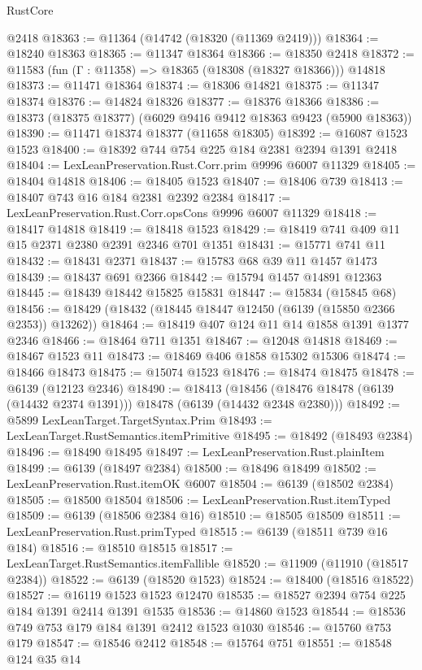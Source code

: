 \begin{lexlean}{RustCore}
\begin{coremodule}
    @2418
@18363 := @11364 (@14742 (@18320 (@11369 @2419)))
@18364 := @18240 @18363
@18365 := @11347 @18364
@18366 := @18350 @2418
@18372 := @11583 (fun (Γ : @11358) => @18365 (@18308 (@18327 @18366))) @14818
@18373 := @11471 @18364
@18374 := @18306 @14821
@18375 := @11347 @18374
@18376 := @14824 @18326
@18377 := @18376 @18366
@18386 := @18373 (@18375 @18377) (@6029 @9416 @9412 @18363 @9423 (@5900 @18363))
@18390 := @11471 @18374 @18377 (@11658 @18305)
@18392 := @16087 @1523 @1523
@18400 := @18392 @744 @754 @225 @184 @2381 @2394 @1391 @2418
@18404 := LexLeanPreservation.Rust.Corr.prim @9996 @6007 @11329
@18405 := @18404 @14818
@18406 := @18405 @1523
@18407 := @18406 @739
@18413 := @18407 @743 @16 @184 @2381 @2392 @2384
@18417 := LexLeanPreservation.Rust.Corr.opsCons @9996 @6007 @11329
@18418 := @18417 @14818
@18419 := @18418 @1523
@18429 := @18419 @741 @409 @11 @15 @2371 @2380 @2391 @2346 @701 @1351
@18431 := @15771 @741 @11
@18432 := @18431 @2371
@18437 := @15783 @68 @39 @11 @1457 @1473
@18439 := @18437 @691 @2366
@18442 := @15794 @1457 @14891 @12363
@18445 := @18439 @18442 @15825 @15831
@18447 := @15834 (@15845 @68)
@18456 := @18429 (@18432 (@18445 @18447 @12450 (@6139 (@15850 @2366 @2353)) @13262))
@18464 := @18419 @407 @124 @11 @14 @1858 @1391 @1377 @2346
@18466 := @18464 @711 @1351
@18467 := @12048 @14818
@18469 := @18467 @1523 @11
@18473 := @18469 @406 @1858 @15302 @15306
@18474 := @18466 @18473
@18475 := @15074 @1523
@18476 := @18474 @18475
@18478 := @6139 (@12123 @2346)
@18490 := @18413
    (@18456 (@18476 @18478 (@6139 (@14432 @2374 @1391))) @18478 (@6139 (@14432 @2348 @2380)))
@18492 := @5899 LexLeanTarget.TargetSyntax.Prim
@18493 := LexLeanTarget.RustSemantics.itemPrimitive
@18495 := @18492 (@18493 @2384)
@18496 := @18490 @18495
@18497 := LexLeanPreservation.Rust.plainItem
@18499 := @6139 (@18497 @2384)
@18500 := @18496 @18499
@18502 := LexLeanPreservation.Rust.itemOK @6007
@18504 := @6139 (@18502 @2384)
@18505 := @18500 @18504
@18506 := LexLeanPreservation.Rust.itemTyped
@18509 := @6139 (@18506 @2384 @16)
@18510 := @18505 @18509
@18511 := LexLeanPreservation.Rust.primTyped
@18515 := @6139 (@18511 @739 @16 @184)
@18516 := @18510 @18515
@18517 := LexLeanTarget.RustSemantics.itemFallible
@18520 := @11909 (@11910 (@18517 @2384))
@18522 := @6139 (@18520 @1523)
@18524 := @18400 (@18516 @18522)
@18527 := @16119 @1523 @1523 @12470
@18535 := @18527 @2394 @754 @225 @184 @1391 @2414 @1391 @1535
@18536 := @14860 @1523
@18544 := @18536 @749 @753 @179 @184 @1391 @2412 @1523 @1030
@18546 := @15760 @753 @179
@18547 := @18546 @2412
@18548 := @15764 @751
@18551 := @18548 @124 @35 @14

\end{coremodule}
\end{lexlean}
